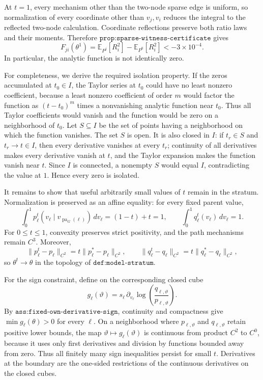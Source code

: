 At \(t=1\), every mechanism other than the two-node sparse edge is uniform, so normalization of every coordinate other than \(v_j,v_i\) reduces the integral to the reflected two-node calculation. Coordinate reflections preserve both ratio laws and their moments. Therefore \(\texttt{prop:sparse-witness-certificate}\) gives
\[
 F_{ji}(\theta^1)
 =\mathbb E_{P^j}[R_i^2]-\mathbb E_{P^0}[R_i^2]
 <-3\times10^{-4}.
\]
In particular, the analytic function is not identically zero.

For completeness, we derive the required isolation property. If the zeros accumulated at \(t_0\in I\), the Taylor series at \(t_0\) could have no least nonzero coefficient, because a least nonzero coefficient of order \(m\) would factor the function as \((t-t_0)^m\) times a nonvanishing analytic function near \(t_0\). Thus all Taylor coefficients would vanish and the function would be zero on a neighborhood of \(t_0\). Let \(S\subseteq I\) be the set of points having a neighborhood on which the function vanishes. The set \(S\) is open. It is also closed in \(I\): if \(t_r\in S\) and \(t_r\to t\in I\), then every derivative vanishes at every \(t_r\); continuity of all derivatives makes every derivative vanish at \(t\), and the Taylor expansion makes the function vanish near \(t\). Since \(I\) is connected, a nonempty \(S\) would equal \(I\), contradicting the value at \(1\). Hence every zero is isolated.

It remains to show that useful arbitrarily small values of \(t\) remain in the stratum. Normalization is preserved as an affine equality: for every fixed parent value,
\[
 \int_0^1p_\ell^t(v_\ell\mid v_{\operatorname{pa}_G(\ell)})\,dv_\ell
 =(1-t)+t=1,
 \qquad
 \int_0^1q_\ell^t(v_\ell)\,dv_\ell=1.
\]
For \(0\le t\le1\), convexity preserves strict positivity, and the path mechanisms remain \(C^3\). Moreover,
\[
 \|p_\ell^t-p_\ell\|_{C^2}=t\|p_\ell^*-p_\ell\|_{C^2},
 \qquad
 \|q_\ell^t-q_\ell\|_{C^2}=t\|q_\ell^*-q_\ell\|_{C^2},
\]
so \(\theta^t\to\theta\) in the topology of \(\texttt{def:model-stratum}\).

For the sign constraint, define on the corresponding closed cube
\[
 g_\ell(\vartheta)
 =s_\ell\,\partial_{v_\ell}
   \log\!\left(\frac{q_{\ell,\vartheta}}{p_{\ell,\vartheta}}\right).
\]
By \(\texttt{ass:fixed-own-derivative-sign}\), continuity and compactness give \(\min g_\ell(\theta)>0\) for every \(\ell\). On a neighborhood where \(p_{\ell,\vartheta}\) and \(q_{\ell,\vartheta}\) retain positive lower bounds, the map \(\vartheta\mapsto g_\ell(\vartheta)\) is continuous from product \(C^2\) to \(C^0\), because it uses only first derivatives and division by functions bounded away from zero. Thus all finitely many sign inequalities persist for small \(t\). Derivatives at the boundary are the one-sided restrictions of the continuous derivatives on the closed cubes.

